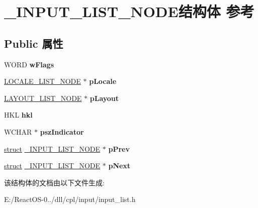 \hypertarget{struct___i_n_p_u_t___l_i_s_t___n_o_d_e}{}\section{\+\_\+\+I\+N\+P\+U\+T\+\_\+\+L\+I\+S\+T\+\_\+\+N\+O\+D\+E结构体 参考}
\label{struct___i_n_p_u_t___l_i_s_t___n_o_d_e}
\subsection*{Public 属性}
\begin{DoxyCompactItemize}
\item 
\mbox{\label{struct___i_n_p_u_t___l_i_s_t___n_o_d_e_a5cfa48bc183c5210fa5add5bc5cb9b27}} 
W\+O\+RD {\bfseries w\+Flags}
\item 
\mbox{\label{struct___i_n_p_u_t___l_i_s_t___n_o_d_e_ab6a1040877b4ad7a236c7f2e5401b8a6}} 
\hyperlink{struct___l_o_c_a_l_e___l_i_s_t___n_o_d_e}{L\+O\+C\+A\+L\+E\+\_\+\+L\+I\+S\+T\+\_\+\+N\+O\+DE} $\ast$ {\bfseries p\+Locale}
\item 
\mbox{\label{struct___i_n_p_u_t___l_i_s_t___n_o_d_e_a845a9ab67f7713c4b2a5c2c095e98c24}} 
\hyperlink{struct___l_a_y_o_u_t___l_i_s_t___n_o_d_e}{L\+A\+Y\+O\+U\+T\+\_\+\+L\+I\+S\+T\+\_\+\+N\+O\+DE} $\ast$ {\bfseries p\+Layout}
\item 
\mbox{\label{struct___i_n_p_u_t___l_i_s_t___n_o_d_e_a83cab5e7cd29eff77a747d7f5a5e2245}} 
H\+KL {\bfseries hkl}
\item 
\mbox{\label{struct___i_n_p_u_t___l_i_s_t___n_o_d_e_ae35cc559f52d2209187221dde4174ccb}} 
W\+C\+H\+AR $\ast$ {\bfseries psz\+Indicator}
\item 
\mbox{\label{struct___i_n_p_u_t___l_i_s_t___n_o_d_e_a2ec245491f80d521b7d092664cfa94d1}} 
\hyperlink{interfacestruct}{struct} \hyperlink{struct___i_n_p_u_t___l_i_s_t___n_o_d_e}{\+\_\+\+I\+N\+P\+U\+T\+\_\+\+L\+I\+S\+T\+\_\+\+N\+O\+DE} $\ast$ {\bfseries p\+Prev}
\item 
\mbox{\label{struct___i_n_p_u_t___l_i_s_t___n_o_d_e_a63c03675d7ac0d614fce9c9eb8a937aa}} 
\hyperlink{interfacestruct}{struct} \hyperlink{struct___i_n_p_u_t___l_i_s_t___n_o_d_e}{\+\_\+\+I\+N\+P\+U\+T\+\_\+\+L\+I\+S\+T\+\_\+\+N\+O\+DE} $\ast$ {\bfseries p\+Next}
\end{DoxyCompactItemize}


该结构体的文档由以下文件生成\+:\begin{DoxyCompactItemize}
\item 
E\+:/\+React\+O\+S-\/0../dll/cpl/input/input\+\_\+list.\+h\end{DoxyCompactItemize}
